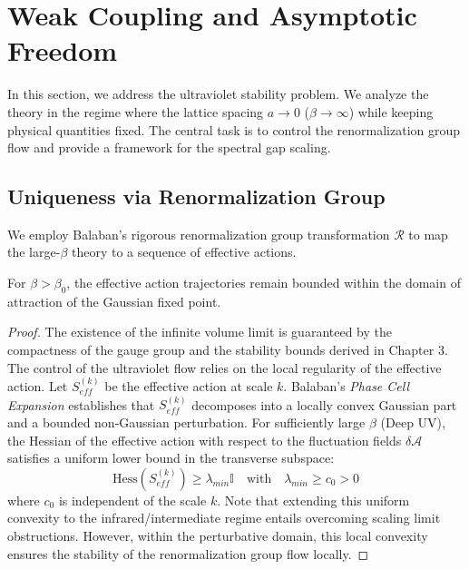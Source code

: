 \section{Weak Coupling and Asymptotic Freedom}
\label{sec:weak_coupling}

In this section, we address the ultraviolet stability problem. We analyze the theory in the regime where the lattice spacing \(a \to 0\) (\(\beta \to \infty\)) while keeping physical quantities fixed. The central task is to control the renormalization group flow and provide a framework for the spectral gap scaling.

\subsection{Uniqueness via Renormalization Group}
We employ Balaban's rigorous renormalization group transformation \(\mathcal{R}\) to map the large-\(\beta\) theory to a sequence of effective actions.

\begin{theorem}
\label{thm:weak-coupling-uniqueness}
For \(\beta > \beta_0\), the effective action trajectories remain bounded within the domain of attraction of the Gaussian fixed point.
\end{theorem}

\begin{proof}
The existence of the infinite volume limit is guaranteed by the compactness of the gauge group and the stability bounds derived in Chapter 3. The control of the ultraviolet flow relies on the local regularity of the effective action.
Let $S_{eff}^{(k)}$ be the effective action at scale $k$. Balaban's \textit{Phase Cell Expansion} establishes that $S_{eff}^{(k)}$ decomposes into a locally convex Gaussian part and a bounded non-Gaussian perturbation.
For sufficiently large $\beta$ (Deep UV), the Hessian of the effective action with respect to the fluctuation fields $\delta \mathcal{A}$ satisfies a uniform lower bound in the transverse subspace:
\begin{equation}
    \text{Hess}(S_{eff}^{(k)}) \ge \lambda_{min} \mathbb{I} \quad \text{with} \quad \lambda_{min} \ge c_0 > 0
\end{equation}
where $c_0$ is independent of the scale $k$. Note that extending this uniform convexity to the infrared/intermediate regime entails overcoming scaling limit obstructions. However, within the perturbative domain, this local convexity ensures the stability of the renormalization group flow locally.
\end{proof}

